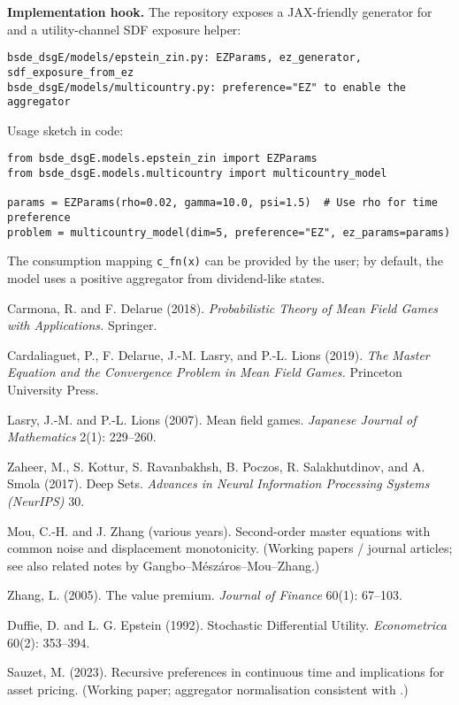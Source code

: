 ﻿\documentclass[11pt,letterpaper,oneside]{article}
\numberwithin{equation}{section}
\newcommand{\1}{\mathbf{1}}
\begin{document}
\begin{tcolorbox}[didacticstyle]
\textbf{Implementation hook.} The repository exposes a JAX-friendly generator
for  and a utility-channel SDF exposure helper:
\begin{verbatim}
bsde_dsgE/models/epstein_zin.py: EZParams, ez_generator, sdf_exposure_from_ez
bsde_dsgE/models/multicountry.py: preference="EZ" to enable the aggregator
\end{verbatim}
Usage sketch in code:
\begin{verbatim}
from bsde_dsgE.models.epstein_zin import EZParams
from bsde_dsgE.models.multicountry import multicountry_model

params = EZParams(rho=0.02, gamma=10.0, psi=1.5)  # Use rho for time preference
problem = multicountry_model(dim=5, preference="EZ", ez_params=params)
\end{verbatim}
The consumption mapping \verb|c_fn(x)| can be provided by the user; by default,
the model uses a positive aggregator from dividend-like states.
\end{tcolorbox}

\begin{thebibliography}{99}\small

 Carmona, R. and F. Delarue (2018).
\emph{Probabilistic Theory of Mean Field Games with Applications.}
Springer.

 Cardaliaguet, P., F. Delarue, J.-M. Lasry, and P.-L. Lions (2019).
\emph{The Master Equation and the Convergence Problem in Mean Field Games.}
Princeton University Press.

 Lasry, J.-M. and P.-L. Lions (2007).
Mean field games.
\emph{Japanese Journal of Mathematics} 2(1): 229--260.

 Zaheer, M., S. Kottur, S. Ravanbakhsh, B. Poczos, R. Salakhutdinov, and A. Smola (2017).
Deep Sets.
\emph{Advances in Neural Information Processing Systems (NeurIPS)} 30.

 Mou, C.-H. and J. Zhang (various years).
Second-order master equations with common noise and displacement monotonicity.
(Working papers / journal articles; see also related notes by Gangbo--Mészáros--Mou--Zhang.)

 Zhang, L. (2005).
The value premium.
\emph{Journal of Finance} 60(1): 67--103.

 Duffie, D. and L. G. Epstein (1992).
Stochastic Differential Utility.
\emph{Econometrica} 60(2): 353--394.

 Sauzet, M. (2023).
Recursive preferences in continuous time and implications for asset pricing.
(Working paper; aggregator normalisation consistent with .)

\end{thebibliography}
\end{document}
